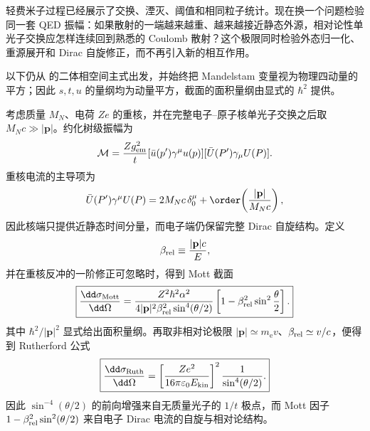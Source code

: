 
轻费米子过程已经展示了交换、湮灭、阈值和相同粒子统计。现在换一个问题检验同一套 QED 振幅：如果散射的一端越来越重、越来越接近静态外源，相对论性单光子交换应怎样连续回到熟悉的 Coulomb 散射？这个极限同时检验外态归一化、重源展开和 Dirac 自旋修正，而不再引入新的相互作用。

以下仍从 的二体相空间主式出发，并始终把 Mandelstam 变量视为物理四动量的平方；因此 $s,t,u$ 的量纲均为动量平方，截面的面积量纲由显式的 $\hbar^2$ 提供。

\begin{exbox}
考虑质量 $M_N$、电荷 $Ze$ 的重核，并在完整电子--原子核单光子交换之后取 $M_Nc\gg |\mathbf p|$。约化树级振幅为
\begin{equation}
 \mathcal M
 =\frac{Zg_{\rm em}^2}{t}
 [\bar u(p')\gamma^\mu u(p)]
 [\bar U(P')\gamma_\mu U(P)].
 \label{eq:mott-reduced-amplitude-si-r10}
\end{equation}
重核电流的主导项为
\begin{equation}
 \bar U(P')\gamma^\mu U(P)
 =2M_Nc\,\delta_0^\mu
 +\order\!\left(\frac{|\mathbf p|}{M_Nc}\right),
 \label{eq:heavy-nucleus-current-si-r10}
\end{equation}
因此核端只提供近静态时间分量，而电子端仍保留完整 Dirac 自旋结构。定义
\begin{equation*}
 \beta_{\rm rel}\equiv\frac{|\mathbf p|c}{E},
\end{equation*}
并在重核反冲的一阶修正可忽略时，得到 Mott 截面
\begin{equation}
 \boxed{
 \frac{\dd\sigma_{\rm Mott}}{\dd\Omega}
 =\frac{Z^2\hbar^2\alpha^2}
 {4|\mathbf p|^2\beta_{\rm rel}^2\sin^4(\theta/2)}
 \left[1-\beta_{\rm rel}^2\sin^2\frac\theta2\right].}
 \label{eq:mott-cross-section-si-r10}
\end{equation}
其中 $\hbar^2/|\mathbf p|^2$ 显式给出面积量纲。再取非相对论极限 $|\mathbf p|\simeq m_{\mathrm e} v$、$\beta_{\rm rel}\simeq v/c$，便得到 Rutherford 公式
\begin{equation}
 \boxed{
 \frac{\dd\sigma_{\rm Ruth}}{\dd\Omega}
 =\left[
 \frac{Ze^2}{16\pi\varepsilon_0E_{\rm kin}}
 \right]^2
 \frac1{\sin^4(\theta/2)}.}
 \label{eq:rutherford-SI-r10}
\end{equation}
因此 $\sin^{-4}(\theta/2)$ 的前向增强来自无质量光子的 $1/t$ 极点，而 Mott 因子 $1-\beta_{\rm rel}^2\sin^2(\theta/2)$ 来自电子 Dirac 电流的自旋与相对论结构。



\end{exbox}
